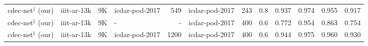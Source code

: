 \documentclass[a4paper,conference]{IEEEtran}
\begin{document}
\begin{table*}[ht!]
\begin{center}
\begin{tabular}{|l| l | r|l |r|l|r| c| c c c c|}
{\sc cd}e{\sc c-n}et$^{\ddagger}$ (our) &{\sc iiit-ar-13k} &9K &{\sc icdar-pod}-2017 &549 &{\sc icdar-pod}-2017 &243 &0.8 &0.937 &0.974 &0.955 &0.917 \\
{\sc cd}e{\sc c-n}et$^{\ddagger}$ (our) &{\sc iiit-ar-13k} &9K &- &- &{\sc icdar-pod}-2017 &400 &0.6 &0.772 &0.954 &0.863 &0.754 \\  
{\sc cd}e{\sc c-n}et$^{\ddagger}$ (our) &{\sc iiit-ar-13k} &9K &{\sc icdar-pod}-2017 &1200 &{\sc icdar-pod}-2017 &400 &0.6 &0.944 &0.975 &0.960 &0.930 \\ \hline
\end{tabular}
\end{center}
\caption{Illustrates comparison between the proposed {\sc cd}e{\sc c-n}et and state-of-the-art techniques on {\sc icdar-pod-2017}. {\sc \textbf{d2:}} indicates {\sc icdar-2013}+{\sc icdar-pod-2017}+{\sc unlv}+Marmot.\textbf{$\dagger$:} indicates model trained with multiple categories. {\sc cd}e{\sc c-n}et$^{\ddagger}$\textbf{:} indicates a single  model which is trained with {\sc iiit-ar-13k} dataset. \label{table_icdar_2017_arxiv}}
\end{table*}
\end{document}
